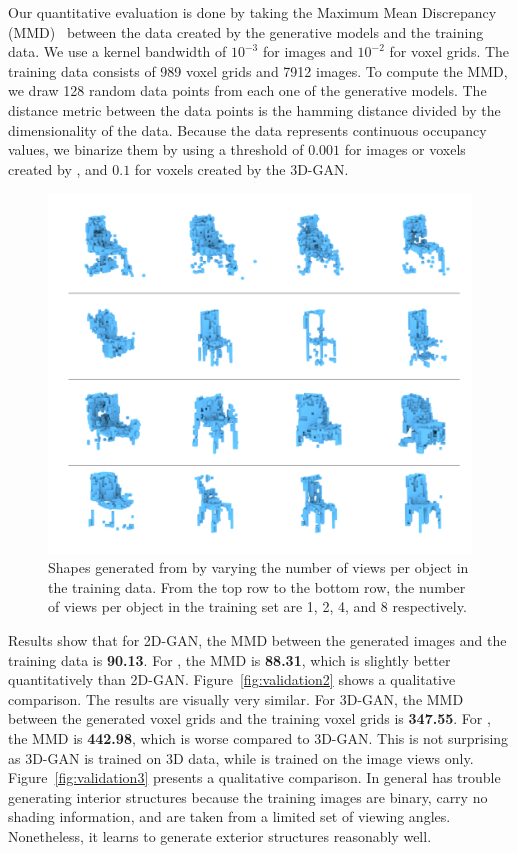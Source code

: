Our quantitative evaluation is done by taking the Maximum Mean Discrepancy (MMD)~\cite{gretton2006kernel} 
between the data created by the generative models and the training data.
We use a kernel bandwidth of $10^{-3}$ for images and $10^{-2}$ for voxel grids.
The training data consists of 989 voxel grids and 7912 images.
To compute the MMD, we draw 128 random data points from each one of the generative models.
The distance metric between the data points is the hamming distance divided by the dimensionality of the data.
Because the data represents continuous occupancy values, we binarize them by using a threshold of $0.001$ for images or voxels created
by \prgan, and $0.1$ for voxels created by the 3D-GAN.

\begin{figure}[t]
\includegraphics[width=0.95\linewidth]{fig/varying_views.png}
\caption{\label{fig:varying_views} Shapes generated from \prgan by varying the number of views per object in the training data. From the top row to the bottom row, the number of views per object in the training set are 1, 2, 4, and 8 respectively.}
\vspace{-8pt}
\end{figure}

Results show that for 2D-GAN, the MMD between the generated images and the training data is \textbf{90.13}. For \prgan, the MMD is \textbf{88.31}, which is slightly better quantitatively than 2D-GAN. Figure~\ref{fig:validation2} shows a qualitative comparison. The results are visually very similar. For 3D-GAN, the MMD between the generated voxel grids and the training voxel grids is \textbf{347.55}. For \prgan, the MMD is \textbf{442.98}, which is worse compared to 3D-GAN. This is not surprising as 3D-GAN is trained on 3D data, while \prgan is trained on the image views only. Figure~\ref{fig:validation3} presents a qualitative comparison. In general \prgan has trouble generating interior structures because the training images are binary, carry no shading information, and are taken from a limited set of viewing angles. Nonetheless, it learns to generate exterior structures reasonably well.



